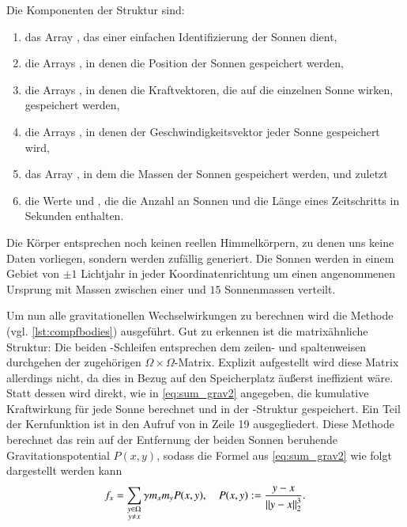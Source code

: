     Die Komponenten der Struktur sind:
    \begin{enumerate}
     \item das Array , das einer einfachen Identifizierung der Sonnen dient,
     \item die Arrays , in denen die Position der Sonnen gespeichert werden,
     \item die Arrays , in denen die Kraftvektoren, die auf die einzelnen Sonne wirken, gespeichert werden,
     \item die Arrays , in denen der Geschwindigkeitsvektor jeder Sonne gespeichert wird,
     \item das Array , in dem die Massen der Sonnen gespeichert werden, und zuletzt
     \item die Werte  und , die die Anzahl an Sonnen und die Länge eines Zeitschritts in Sekunden enthalten.
    \end{enumerate}
    
    Die Körper entsprechen noch keinen reellen Himmelkörpern, zu denen uns keine Daten vorliegen, sondern werden zufällig generiert. Die Sonnen werden in einem Gebiet von $\pm 1$ Lichtjahr in
    jeder Koordinatenrichtung um einen angenommenen Ursprung mit Massen zwischen einer und $15$ Sonnenmassen verteilt.

    Um nun alle gravitationellen Wechselwirkungen zu berechnen wird die Methode  (vgl. \autoref{lst:compfbodies}) ausgeführt.
    Gut zu erkennen ist die matrixähnliche Struktur: Die beiden -Schleifen entsprechen dem zeilen- und spaltenweisen durchgehen der zugehörigen $\Omega \times \Omega$-Matrix. 
    Explizit aufgestellt wird diese Matrix allerdings nicht, da dies in Bezug auf den Speicherplatz äußerst ineffizient wäre. Statt dessen wird direkt, wie in \autoref{eq:sum_grav2}
    angegeben, die kumulative Kraftwirkung für jede Sonne berechnet und in der -Struktur gespeichert. Ein Teil der Kernfunktion ist in den Aufruf von 
    in Zeile 19 ausgegliedert. 
    Diese Methode berechnet das rein auf der Entfernung der beiden Sonnen beruhende Gravitationspotential $P(x,y)$, sodass die Formel aus \autoref{eq:sum_grav2} wie folgt dargestellt werden kann
    \[
      f_x = \sum_{\substack{y \in \Omega \\ y \neq x}} \gamma m_x  m_y P(x, y), \ \ \ \ P(x, y) := \frac{y - x}{\left\lVert y - x\right\rVert^3_2}.
    \]
    

